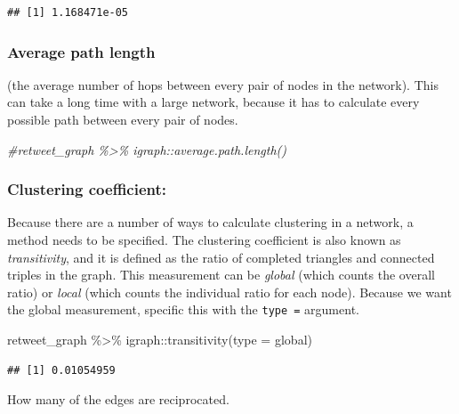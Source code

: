 \documentclass[
]{book}
\newenvironment{Shaded}{\begin{snugshade}}{\end{snugshade}}
\newcommand{\AttributeTok}[1]{\textcolor[rgb]{0.77,0.63,0.00}{#1}}
\newcommand{\CommentTok}[1]{\textcolor[rgb]{0.56,0.35,0.01}{\textit{#1}}}
\newcommand{\FunctionTok}[1]{\textcolor[rgb]{0.00,0.00,0.00}{#1}}
\newcommand{\NormalTok}[1]{#1}
\newcommand{\SpecialCharTok}[1]{\textcolor[rgb]{0.00,0.00,0.00}{#1}}
\newcommand{\StringTok}[1]{\textcolor[rgb]{0.31,0.60,0.02}{#1}}
\begin{document}
\begin{verbatim}
## [1] 1.168471e-05
\end{verbatim}

\hypertarget{average-path-length-2}{%
\subsubsection{Average path length}\label{average-path-length-2}}

(the average number of hops between every pair of nodes in the network). This can take a long time with a large network, because it has to calculate every possible path between every pair of nodes.

\begin{Shaded}
\begin{Highlighting}[]
\CommentTok{\#retweet\_graph \%\textgreater{}\% igraph::average.path.length()}
\end{Highlighting}
\end{Shaded}

\hypertarget{clustering-coefficient-2}{%
\subsubsection{Clustering coefficient:}\label{clustering-coefficient-2}}

Because there are a number of ways to calculate clustering in a network, a method needs to be specified. The clustering coefficient is also known as \emph{transitivity}, and it is defined as the ratio of completed triangles and connected triples in the graph. This measurement can be \emph{global} (which counts the overall ratio) or \emph{local} (which counts the individual ratio for each node). Because we want the global measurement, specific this with the \texttt{type\ =} argument.

\begin{Shaded}
\begin{Highlighting}[]
\NormalTok{retweet\_graph }\SpecialCharTok{\%\textgreater{}\%}\NormalTok{ igraph}\SpecialCharTok{::}\FunctionTok{transitivity}\NormalTok{(}\AttributeTok{type =} \StringTok{\textquotesingle{}global\textquotesingle{}}\NormalTok{)}
\end{Highlighting}
\end{Shaded}

\begin{verbatim}
## [1] 0.01054959
\end{verbatim}

How many of the edges are reciprocated.
\end{document}
